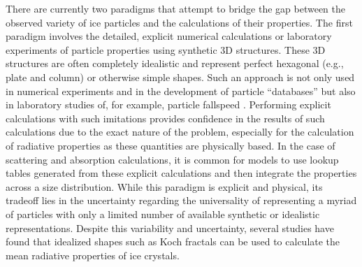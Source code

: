 \documentclass[amt, manuscript]{copernicus}
\begin{document}
There are currently two paradigms that attempt to bridge the gap between the observed variety of ice particles and the calculations of their properties. The first paradigm involves the detailed, explicit numerical calculations or laboratory experiments of particle properties using synthetic 3D structures. These 3D structures are often completely idealistic and represent perfect hexagonal (e.g., plate and column) or otherwise simple shapes. Such an approach is not only used in numerical experiments \citep[e.g.,][]{Um2009,Schrom2018b,Schrom2019} and in the development of particle ``databases'' \citep[e.g.,][]{Liu2008,Lu2016,Schrom2023}  but also in laboratory studies of, for example, particle fallspeed \citep[e.g.,][]{Westbrook2017,McCorquodale2020a,McCorquodale2020b}. Performing explicit calculations with such imitations provides confidence in the results of such calculations due to the exact nature of the problem, especially for the calculation of radiative properties as these quantities are physically based. In the case of scattering and absorption calculations, it is common for models to use lookup tables generated from these explicit calculations and then integrate the properties across a size distribution. While this paradigm is explicit and physical, its tradeoff lies in the uncertainty regarding the universality of representing a myriad of particles with only a limited number of available synthetic or idealistic representations. Despite this variability and uncertainty, several studies have found that idealized shapes such as Koch fractals \citep{Macke1996,McFarquhar1999} can be used to calculate the mean radiative properties of ice crystals.
\end{document}

